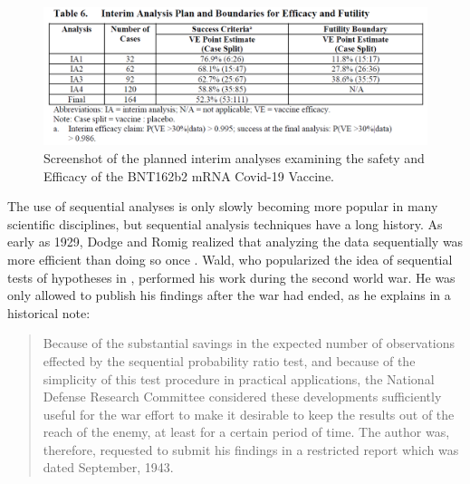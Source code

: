 \documentclass[
  oneside]{book}
\begin{document}
\begin{figure}

{\centering \includegraphics[width=1\linewidth]{images/vaccinetrial} 

}

\caption{Screenshot of the planned interim analyses examining the safety and Efficacy of the BNT162b2 mRNA Covid-19 Vaccine.}\label{fig:interim}
\end{figure}

The use of sequential analyses is only slowly becoming more popular in many scientific disciplines, but sequential analysis techniques have a long history. As early as 1929, Dodge and Romig realized that analyzing the data sequentially was more efficient than doing so once \citep{dodge_method_1929}. Wald, who popularized the idea of sequential tests of hypotheses in \citeyearpar{wald_sequential_1945}, performed his work during the second world war. He was only allowed to publish his findings after the war had ended, as he explains in a historical note:

\begin{quote}
Because of the substantial savings in the expected number of observations effected by the sequential probability ratio test, and because of the simplicity of this test procedure in practical applications, the National Defense Research Committee considered these developments sufficiently useful for the war effort to make it desirable to keep the results out of the reach of the enemy, at least for a certain period of time. The author was, therefore, requested to submit his findings in a restricted report which was dated September, 1943.
\end{quote}
\end{document}
